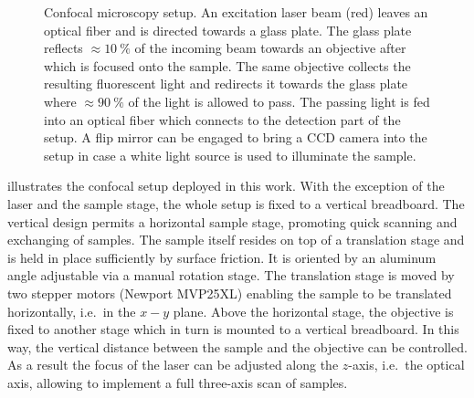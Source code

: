 		\begin{figure}[!htb]
			\centering
			\caption[Confocal microscopy setup]{Confocal microscopy setup. An excitation laser beam (red) leaves an optical fiber and is directed towards a glass plate. The glass plate reflects $\approx \SI{10}{\percent}$ of the incoming beam towards an objective after which is focused onto the sample. The same objective collects the resulting fluorescent light and redirects it towards the glass plate where $\approx \SI{90}{\percent}$ of the light is allowed to pass. The passing \fl light is fed into an optical fiber which connects to the detection part of the setup. A flip mirror can be engaged to bring a CCD camera into the setup in case a white light source is used to illuminate the sample.}
			\label{fig::confocal_setup}
		\end{figure}

		 illustrates the confocal setup deployed in this work.
		With the exception of the laser and the sample stage, the whole setup is fixed to a vertical breadboard.
		The vertical design permits a horizontal sample stage, promoting quick scanning and exchanging of samples.
		The sample itself resides on top of a translation stage and is held in place sufficiently by surface friction.
		It is oriented by an aluminum angle adjustable via a manual rotation stage.
		The translation stage is moved by two stepper motors (Newport MVP25XL) enabling the sample to be translated horizontally, i.e.\ in the $x-y$ plane.
		Above the horizontal stage, the objective is fixed to another stage which in turn is mounted to a vertical breadboard.
		In this way, the vertical distance between the sample and the objective can be controlled. As a result the focus of the laser can be adjusted along the $z$-axis, i.e.\ the optical axis, allowing to implement a full three-axis scan of samples.

